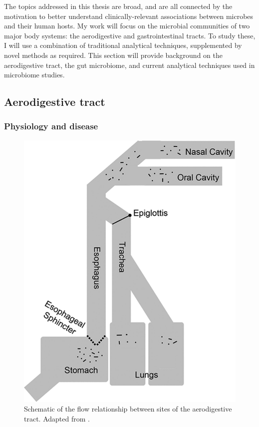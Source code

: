 \documentclass[12pt]{article}
\begin{document}
The topics addressed in this thesis are broad, and are all connected by
the motivation to better understand
clinically-relevant associations between microbes and their human hosts.
My work will focus on the microbial communities of two major body systems:
the aerodigestive and gastrointestinal tracts. To study these, I will 
use a combination of traditional analytical techniques, supplemented by 
novel methods as required. This section will provide background on
the aerodigestive tract, the gut microbiome, and current analytical techniques 
used in microbiome studies. 

\subsection{Aerodigestive tract}

\subsubsection{Physiology and disease}

\begin{figure}
\begin{center}
    \includegraphics[scale=0.35]{aero_tract}
    \caption{Schematic of the flow relationship between sites of the 
    aerodigestive tract. Adapted from \cite{bassis-source-2015}.}\label{fig:aero_tract}
\end{center}
\end{figure}
\end{document}
